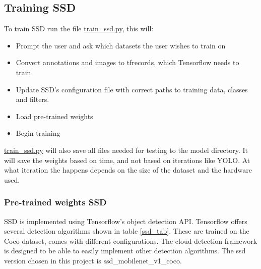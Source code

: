 \newpage

\subsection{Training SSD}
To train SSD run the file \url{train_ssd.py}, this will:

\begin{itemize}
    \item Prompt the user and ask which datasets the user wishes to train on
    \item Convert annotations and images to tfrecords, which Tensorflow needs to train.
    \item Update SSD's configuration file with correct paths to training data, classes and filters.
    \item Load pre-trained weights
    \item Begin training
\end{itemize}

\url{train_ssd.py} will also save all files needed for testing to the model directory. It will save the weights based on time, and not based on iterations like YOLO. At what iteration the happens depends on the size of the dataset and the hardware used. 

\subsubsection{Pre-trained weights SSD}
SSD is implemented using Tensorflow's object detection API. Tensorflow offers several detection algorithms shown in table \ref{ssd_tab}. These are trained on the Coco dataset, comes with different configurations. The cloud detection framework is designed to be able to easily implement other detection algorithms. The ssd version chosen in this project is ssd\_mobilenet\_v1\_coco.

